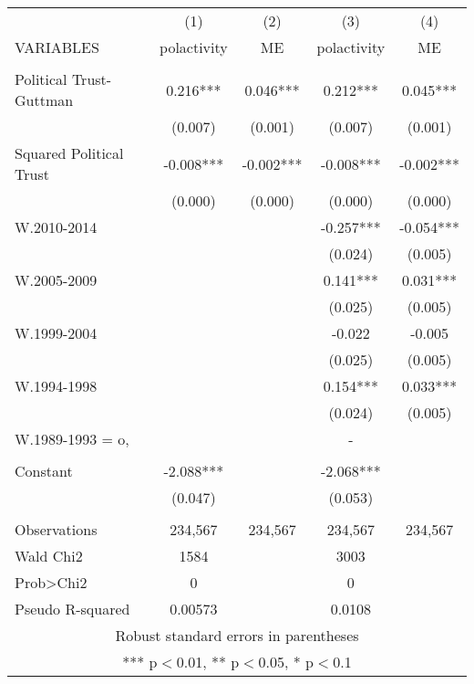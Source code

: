 \documentclass[]{article}
\begin{document}
\begin{tabular}{lcccc} \hline
 & (1) & (2) & (3) & (4) \\
VARIABLES & polactivity & ME & polactivity & ME \\ \hline
 &  &  &  &  \\
Political Trust-Guttman & 0.216*** & 0.046*** & 0.212*** & 0.045*** \\
 & (0.007) & (0.001) & (0.007) & (0.001) \\
Squared Political Trust & -0.008*** & -0.002*** & -0.008*** & -0.002*** \\
 & (0.000) & (0.000) & (0.000) & (0.000) \\
W.2010-2014 &  &  & -0.257*** & -0.054*** \\
 &  &  & (0.024) & (0.005) \\
W.2005-2009 &  &  & 0.141*** & 0.031*** \\
 &  &  & (0.025) & (0.005) \\
W.1999-2004 &  &  & -0.022 & -0.005 \\
 &  &  & (0.025) & (0.005) \\
W.1994-1998 &  &  & 0.154*** & 0.033*** \\
 &  &  & (0.024) & (0.005) \\
W.1989-1993 = o, &  &  & - &  \\
 &  &  &  &  \\
Constant & -2.088*** &  & -2.068*** &  \\
 & (0.047) &  & (0.053) &  \\
 &  &  &  &  \\
Observations & 234,567 & 234,567 & 234,567 & 234,567 \\
Wald Chi2 & 1584 &  & 3003 &  \\
Prob>Chi2 & 0 &  & 0 &  \\
 Pseudo R-squared & 0.00573 &  & 0.0108 &  \\ \hline
\multicolumn{5}{c}{ Robust standard errors in parentheses} \\
\multicolumn{5}{c}{ *** p$<$0.01, ** p$<$0.05, * p$<$0.1} \\
\end{tabular}
\end{document}
